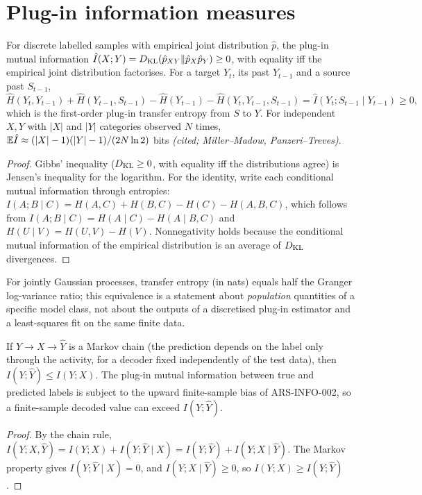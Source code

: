 \section{Plug-in information measures}
\begin{theorem}\label{ars:info-002}
For discrete labelled samples with empirical joint distribution $\hat p$, the plug-in mutual information $\hat I(X;Y)=D_{\mathrm{KL}}(\hat p_{XY}\Vert\hat p_X\hat p_Y)\ge0$, with equality iff the empirical joint distribution factorises. For a target $Y_t$, its past $Y_{t-1}$ and a source past $S_{t-1}$,
\[\hat H(Y_t,Y_{t-1})+\hat H(Y_{t-1},S_{t-1})-\hat H(Y_{t-1})-\hat H(Y_t,Y_{t-1},S_{t-1})=\hat I(Y_t;S_{t-1}\mid Y_{t-1})\ge0,\]
which is the first-order plug-in transfer entropy from $S$ to $Y$. For independent $X,Y$ with $|X|$ and $|Y|$ categories observed $N$ times, $\mathbb E\hat I\approx(|X|-1)(|Y|-1)/(2N\ln2)$ bits \emph{(cited; Miller--Madow, Panzeri--Treves)}.
\end{theorem}
\begin{proof}
Gibbs' inequality ($D_{\mathrm{KL}}\ge0$, with equality iff the distributions agree) is Jensen's inequality for the logarithm. For the identity, write each conditional mutual information through entropies: $I(A;B\mid C)=H(A,C)+H(B,C)-H(C)-H(A,B,C)$, which follows from $I(A;B\mid C)=H(A\mid C)-H(A\mid B,C)$ and $H(U\mid V)=H(U,V)-H(V)$. Nonnegativity holds because the conditional mutual information of the empirical distribution is an average of $D_{\mathrm{KL}}$ divergences.
\end{proof}
For jointly Gaussian processes, transfer entropy (in nats) equals half the Granger log-variance ratio; this equivalence is a statement about \emph{population} quantities of a specific model class, not about the outputs of a discretised plug-in estimator and a least-squares fit on the same finite data.

\begin{theorem}\label{ars:info-003}
If $Y\to X\to\hat Y$ is a Markov chain (the prediction depends on the label only through the activity, for a decoder fixed independently of the test data), then $I(Y;\hat Y)\le I(Y;X)$. The plug-in mutual information between true and predicted labels is subject to the upward finite-sample bias of ARS-INFO-002, so a finite-sample decoded value can exceed $I(Y;\hat Y)$.
\end{theorem}
\begin{proof}
By the chain rule, $I(Y;X,\hat Y)=I(Y;X)+I(Y;\hat Y\mid X)=I(Y;\hat Y)+I(Y;X\mid\hat Y)$. The Markov property gives $I(Y;\hat Y\mid X)=0$, and $I(Y;X\mid\hat Y)\ge0$, so $I(Y;X)\ge I(Y;\hat Y)$.
\end{proof}


